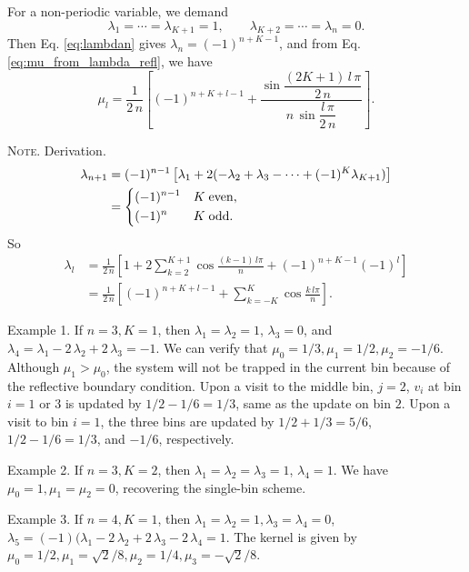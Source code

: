 \documentclass[reprint, floatfix]{revtex4-1}
\newcommand{\note}[1]{{\color{DarkGreen}\footnotesize \textsc{Note.} #1}}
\begin{document}
For a non-periodic variable, we demand
$$
\lambda_1 = \cdots = \lambda_{K+1} = 1,
\qquad
\lambda_{K+2} = \cdots = \lambda_n = 0.
$$
Then Eq. \eqref{eq:lambdan} gives
$\lambda_n = (-1)^{n+K-1}$,
and from Eq. \eqref{eq:mu_from_lambda_refl},
we have
\begin{equation}
  \mu_l
  =
  \frac{1}{2 \, n}
  \left[
    (-1)^{n+K+l-1}
    +
    \frac{
      \sin
      \dfrac{ (2 K + 1) \, l \, \pi }
           {         2 \, n        }
    }
    {
      n \, \sin \dfrac{ l \, \pi } { 2 \, n }
    }
  \right]
  .
\label{eq:mu_sinc_refl}
\end{equation}
\note{Derivation.
$$
\begin{aligned}
  \lambda_{n+1}
  &=
  (-1)^{n-1}
  \left[
    \lambda_1
    + 2 (-\lambda_2 + \lambda_3 - \cdots + (-1)^K \lambda_{K+1})
  \right]
  \\
  &=
  \begin{dcases}
    (-1)^{n-1} & K \mathrm{\; even,} \\
    (-1)^n     & K \mathrm{\; odd.}
  \end{dcases}
\end{aligned}
$$
So
$$
\begin{aligned}
  \lambda_l
  &=
  \frac{1}{2\,n}
  \left[
    1 +
    2 \sum_{k=2}^{K+1}
    \cos \frac { (k - 1) \, l \pi } { n }
    +
    (-1)^{n+K-1} (-1)^l
  \right]
  \\
  &=
  \frac{1}{2\,n}
  \left[
    (-1)^{n+K+l-1}
    +
    \sum_{k=-K}^{K}
    \cos \frac { k \, l \pi } { n }
  \right]
  .
\end{aligned}
$$

\hrulefill

Example 1. If $n = 3, K = 1$,
then $\lambda_1 = \lambda_2 = 1$, $\lambda_3 = 0$,
and $\lambda_4 = \lambda_1 - 2 \, \lambda_2 + 2 \, \lambda_3 = -1$.
%
We can verify that $\mu_0 = 1/3, \mu_1 = 1/2, \mu_2 = -1/6$.
%
Although $\mu_1 > \mu_0$, the system will not be trapped
in the current bin because of the reflective boundary condition.
%
Upon a visit to the middle bin, $j = 2$,
$v_i$ at bin $i = 1$ or $3$ is updated by $1/2 - 1/6 = 1/3$,
same as the update on bin $2$.
Upon a visit to bin $i = 1$, the three bins are updated
by $1/2 + 1/3 = 5/6$, $1/2 - 1/6 = 1/3$, and $-1/6$,
respectively.

\hrulefill

Example 2. If $n = 3, K = 2$,
then $\lambda_1 = \lambda_2 = \lambda_3 = 1$, $\lambda_4 = 1$.
We have $\mu_0 = 1, \mu_1 = \mu_2 = 0$,
recovering the single-bin scheme.

\hrulefill

Example 3. If $n = 4, K = 1$,
then $\lambda_1 = \lambda_2 = 1, \lambda_3 = \lambda_4 = 0$,
$\lambda_5 = (-1)(\lambda_1 - 2 \, \lambda_2 + 2 \, \lambda_3 - 2 \, \lambda_4 = 1$.
The kernel is given by
$\mu_0 = 1/2, \mu_1 = \sqrt{2}/8, \mu_2 = 1/4, \mu_3 = -\sqrt{2}/8$.
}
\end{document}
